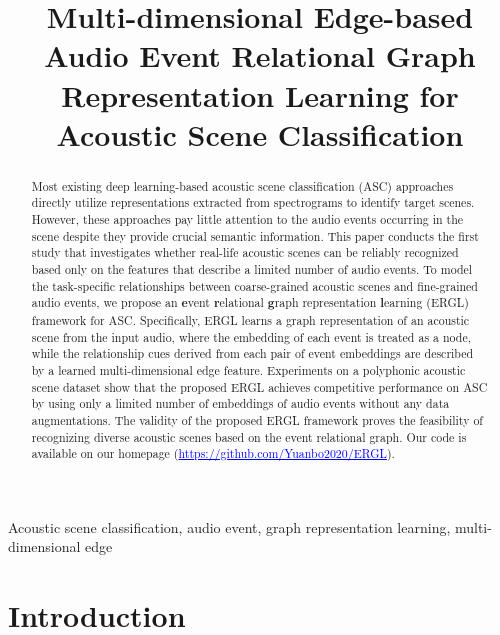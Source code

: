 \documentclass{article}
\title{Multi-dimensional Edge-based Audio Event Relational Graph Representation Learning for Acoustic Scene Classification}
\begin{document}

\maketitle 

\begin{abstract}

\vspace{-0.1cm}
\noindent Most existing deep learning-based acoustic scene classification (ASC) approaches directly utilize representations extracted from spectrograms to identify target scenes. 
However, these approaches pay little attention to the audio events occurring in the scene despite they provide crucial semantic information.
This paper conducts the first study that investigates whether real-life acoustic scenes can be reliably recognized based only on the features that describe a limited number of audio events. 
To model the task-specific relationships between coarse-grained acoustic scenes and fine-grained audio events, we propose an \textbf{e}vent \textbf{r}elational \textbf{g}raph representation \textbf{l}earning (ERGL) framework for ASC. 
Specifically, ERGL learns a graph representation of an acoustic scene from the input audio, where the embedding of each event is treated as a node, while the relationship cues derived from each pair of event embeddings are described by a learned multi-dimensional edge feature.
Experiments on a polyphonic acoustic scene dataset show that the proposed ERGL achieves competitive performance on ASC by using only a limited number of embeddings of audio events without any data augmentations.
The validity of the proposed ERGL framework proves the feasibility of recognizing diverse acoustic scenes based on the event relational graph.
Our code is available on our homepage
{{(\textcolor{blue}{\underline{https://github.com/Yuanbo2020/ERGL}})}}. 




\end{abstract}

\vspace{-0.1cm}
\begin{keywords} 
Acoustic scene classification,
audio event,
graph representation learning, 
multi-dimensional edge
\end{keywords}
 


\vspace{-0.4cm}
\section{Introduction}
\label{sec:intro}
\end{document}
